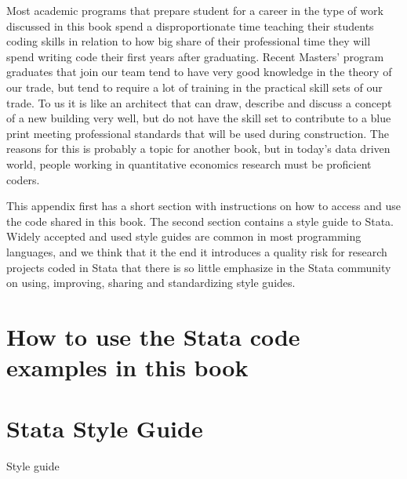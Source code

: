 
\begin{fullwidth}
	
Most academic programs that prepare student for a career in the type of work discussed in this book spend a disproportionate time teaching their students coding skills in relation to how big share of their professional time they will spend writing code their first years after graduating. Recent Masters' program graduates that join our team tend to have very good knowledge in the theory of our trade, but tend to require a lot of training in the practical skill sets of our trade. To us it is like an architect that can draw, describe and discuss a concept of a new building very well, but do not have the skill set to contribute to a blue print meeting professional standards that will be used during construction. The reasons for this is probably a topic for another book, but in today's data driven world, people working in quantitative economics research must be proficient coders.

This appendix first has a short section with instructions on how to access and use the code shared in this book. The second section contains a style guide to Stata. Widely accepted and used style guides are common in most programming languages, and we think that it the end it introduces a quality risk for research projects coded in Stata that there is so little emphasize in the Stata community on using, improving, sharing and standardizing style guides.


\end{fullwidth}


\section{How to use the Stata code examples in this book}


\section{Stata Style Guide}

Style guide

\mainmatter
